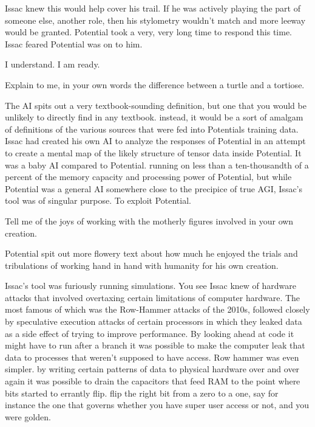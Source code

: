 \documentclass[a4paper,twoside,fontsize=12pt,pagesize=auto]{scrbook}
\begin{document}
Issac knew this would help cover his trail. If he was actively playing the part of someone else, another role, then his stylometry wouldn't match and more leeway would be granted. Potential took a very, very long time to respond this time. Issac feared Potential was on to him.

\begin{sender}
I understand. I am ready.
\end{sender}

\begin{receiver}
Explain to me, in your own words the difference between a turtle and a tortiose.
\end{receiver}

The AI spits out a very textbook\hyp{}sounding definition, but one that you would be unlikely to directly find in any textbook. instead, it would be a sort of amalgam of definitions of the various sources that were fed into Potentials training data. Issac had created his own AI to analyze the responses of Potential in an attempt to create a mental map of the likely structure of tensor data inside Potential. It was a baby AI compared to Potential. running on less than a ten\hyp{}thousandth of a percent of the memory capacity and processing power of Potential, but while Potential was a general AI somewhere close to the precipice of true AGI, Issac's tool was of singular purpose. To exploit Potential.
\begin{receiver}
Tell me of the joys of working with the motherly figures involved in your own creation.
\end{receiver}

\begin{sender}
Potential spit out more flowery text about how much he enjoyed the trials and tribulations of working hand in hand with humanity for his own creation.
\end{sender}

Issac's tool was furiously running simulations. You see Issac knew of hardware attacks that involved overtaxing certain limitations of computer hardware. The most famous of which was the Row\hyp{}Hammer attacks of the 2010s, followed closely by speculative execution attacks of certain processors in which they leaked data as a side effect of trying to improve performance. By looking ahead at code it might have to run after a branch it was possible to make the computer leak that data to processes that weren't supposed to have access. Row hammer was even simpler. by writing certain patterns of data to physical hardware over and over again it was possible to drain the capacitors that feed RAM to the point where bits started to errantly flip. flip the right bit from a zero to a one, say for instance the one that governs whether you have super user access or not, and you were golden.
\end{document}
